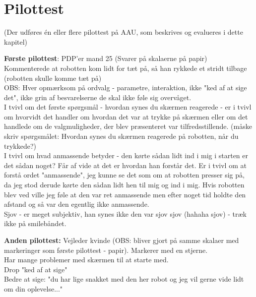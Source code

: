 \chapter{Pilottest}
\label{TestAfSkalaPilottest}
%
(Der udføres én eller flere pilottest på AAU, som beskrives og evalueres i dette kapitel)

\textbf{Første pilottest}: PDP'er mand 25 (Svarer på skalaerne på papir)\\

Kommenterede at robotten kom lidt for tæt på, så han rykkede et stridt tilbage (robotten skulle komme tæt på)\\

OBS: Hver opmærksom på ordvalg - parametre, interaktion, ikke "ked af at sige det", ikke grin af besvarelserne de skal ikke føle sig overvåget.\\ 

I tvivl om det første spørgsmål - hvordan synes du skærmen reagerede - er i tvivl om hvorvidt det handler om hvordan det var at trykke på skærmen eller om det handlede om de valgmuligheder, der blev præsenteret var tilfredsstillende. (måske skriv spørgsmålet: Hvordan synes du skærmen reagerede på robotten, når du trykkede?)\\ 

I tvivl om hvad anmassende betyder - den kørte sådan lidt ind i mig i starten er det sådan noget? Får af vide at det er hvordan han forstår det. Er i tvivl om at forstå ordet "anmassende", jeg kunne se det som om at robotten presser sig på, da jeg stod derude kørte den sådan lidt hen til mig og ind i mig. Hvis robotten blev ved ville jeg føle at den var ret anmassende men efter noget tid holdte den afstand og så var den egentlig ikke anmassende.\\

Sjov - er meget subjektiv, han synes ikke den var sjov sjov (hahaha sjov) - træk ikke på smilebåndet. 

\textbf{Anden pilottest:} Vejleder kvinde (OBS: bliver gjort på samme skalaer med markeringer som første pilottest - papir). Markerer med en stjerne.\\

Har mange problemer med skærmen til at starte med.\\

Drop "ked af at sige"\\ 

Bedre at sige: "du har lige snakket med den her robot og jeg vil gerne vide lidt om din oplevelse..."\\

